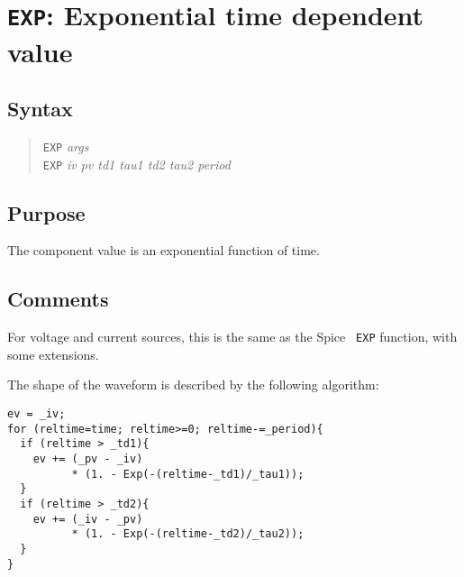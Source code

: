 %
%
%
%
\section{{\tt EXP}: Exponential time dependent value}
\subsection{Syntax}
\begin{verse}
{\tt EXP} {\it args}\\
{\tt EXP} {\it iv pv td1 tau1 td2 tau2 period}
\end{verse}
\subsection{Purpose}

The component value is an exponential function of time.
\subsection{Comments}

For voltage and current sources, this is the same as the Spice {\tt
EXP} function, with some extensions.

The shape of the waveform is described by the following algorithm:

\begin{verbatim}
ev = _iv;
for (reltime=time; reltime>=0; reltime-=_period){
  if (reltime > _td1){
    ev += (_pv - _iv) 
          * (1. - Exp(-(reltime-_td1)/_tau1));
  }
  if (reltime > _td2){
    ev += (_iv - _pv) 
          * (1. - Exp(-(reltime-_td2)/_tau2));
  }
}
\end{verbatim}

